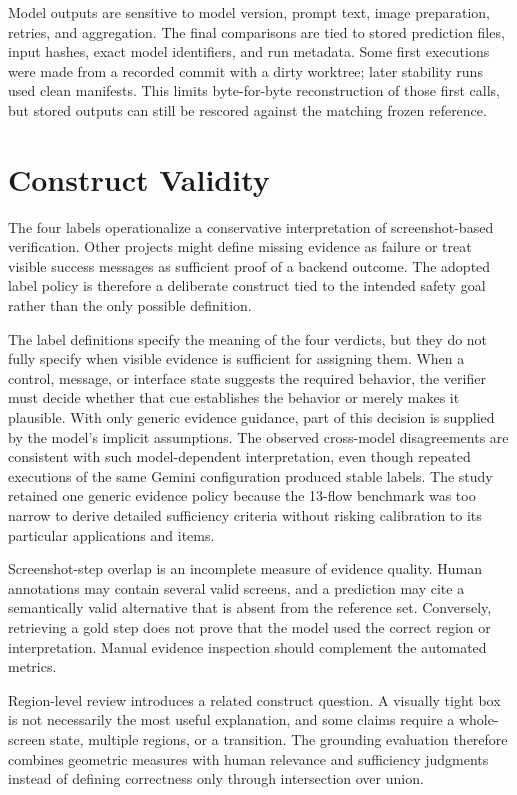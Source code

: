 Model outputs are sensitive to model version, prompt text, image preparation,
retries, and aggregation. The final comparisons are tied to stored prediction
files, input hashes, exact model identifiers, and run metadata. Some first
executions were made from a recorded commit with a dirty worktree; later
stability runs used clean manifests. This limits byte-for-byte reconstruction
of those first calls, but stored outputs can still be rescored against the
matching frozen reference.

\section{Construct Validity}\label{construct-validity}

The four labels operationalize a conservative interpretation of screenshot-based verification. Other projects might define missing evidence as failure or treat visible success messages as sufficient proof of a backend outcome. The adopted label policy is therefore a deliberate construct tied to the intended safety goal rather than the only possible definition.

The label definitions specify the meaning of the four verdicts, but they do not
fully specify when visible evidence is sufficient for assigning them. When a
control, message, or interface state suggests the required behavior, the
verifier must decide whether that cue establishes the behavior or merely makes
it plausible. With only generic evidence guidance, part of this decision is
supplied by the model's implicit assumptions. The observed cross-model
disagreements are consistent with such model-dependent interpretation, even
though repeated executions of the same Gemini configuration produced stable
labels. The study retained one generic evidence policy because the 13-flow
benchmark was too narrow to derive detailed sufficiency criteria without
risking calibration to its particular applications and items.

Screenshot-step overlap is an incomplete measure of evidence quality. Human annotations may contain several valid screens, and a prediction may cite a semantically valid alternative that is absent from the reference set. Conversely, retrieving a gold step does not prove that the model used the correct region or interpretation. Manual evidence inspection should complement the automated metrics.

Region-level review introduces a related construct question. A visually tight
box is not necessarily the most useful explanation, and some claims require a
whole-screen state, multiple regions, or a transition. The grounding evaluation
therefore combines geometric measures with human relevance and sufficiency
judgments instead of defining correctness only through intersection over union.

